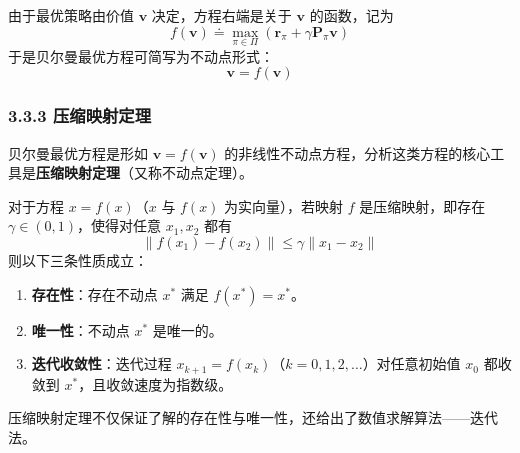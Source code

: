 \documentclass[UTF8]{article}
\begin{document}
由于最优策略由价值 $\boldsymbol{v}$ 决定，方程右端是关于 $\boldsymbol{v}$ 的函数，记为
\[
f(\boldsymbol{v}) \doteq \max_{\pi \in \Pi} \left( \boldsymbol{r}_\pi + \gamma \boldsymbol{P}_\pi \boldsymbol{v} \right)
\]
于是贝尔曼最优方程可简写为不动点形式：
\begin{equation}
\label{eq:boe_fixed_point}
\boldsymbol{v} = f(\boldsymbol{v})
\end{equation}

\subsubsection*{3.3.3 压缩映射定理}

贝尔曼最优方程是形如 $\boldsymbol{v}=f(\boldsymbol{v})$ 的非线性不动点方程，分析这类方程的核心工具是\textbf{压缩映射定理}（又称不动点定理）。

\begin{theorembox}[3.1 压缩映射定理]
    对于方程 $x = f(x)$（$x$ 与 $f(x)$ 为实向量），若映射 $f$ 是压缩映射，即存在 $\gamma \in (0,1)$，使得对任意 $x_1, x_2$ 都有
    \[
    \| f(x_1) - f(x_2) \| \leq \gamma \| x_1 - x_2 \|
    \]
    则以下三条性质成立：
    \begin{enumerate}
        \item \textbf{存在性}：存在不动点 $x^*$ 满足 $f(x^*) = x^*$。
        \item \textbf{唯一性}：不动点 $x^*$ 是唯一的。
        \item \textbf{迭代收敛性}：迭代过程 $x_{k+1} = f(x_k)$（$k=0,1,2,\dots$）对任意初始值 $x_0$ 都收敛到 $x^*$，且收敛速度为指数级。
    \end{enumerate}
\end{theorembox}

压缩映射定理不仅保证了解的存在性与唯一性，还给出了数值求解算法——迭代法。
\end{document}
